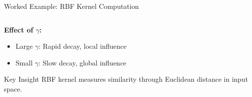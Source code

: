 \documentclass[8pt,aspectratio=1610]{beamer}
\begin{document}
\begin{frame}{Worked Example: RBF Kernel Computation}
\begin{columns}[t]
\begin{column}{0.48\textwidth}
\vspace{0.3cm}
\textbf{Effect of $\gamma$:}
\begin{itemize}
\setlength{\itemsep}{1pt}
\item Large $\gamma$: Rapid decay, local influence
\item Small $\gamma$: Slow decay, global influence
\end{itemize}

\vspace{0.3cm}
\begin{alertblock}{Key Insight}
RBF kernel measures similarity through Euclidean distance in input space.
\end{alertblock}
\end{column}
\end{columns}
\end{frame}
\end{document}
